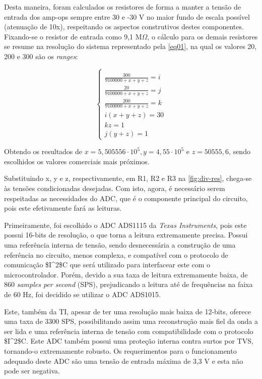 Desta maneira, foram calculados os resistores de forma a manter a tensão de entrada dos \gls{amp-op}s sempre entre 30 e -30 V no maior fundo de escala possível (atenuação de 10x), respeitando os aspectos construtivos destes componentes. Fixando-se o resistor de entrada como 9,1 M$\Omega$, o cálculo para os demais resistores se resume na resolução do sistema representado pela \autoref{eq01}, na qual os valores 20, 200 e 300 são os \textit{ranges}:

\begin{equation}
    \label{eq01}
    \left\{\begin{matrix}
        \\ \frac{300}{9100000+x+y+z} = i
        \\ \frac{20}{9100000+x+y+z} = j
        \\ \frac{200}{9100000+x+y+z} = k
        \\ i (x+y+z) = 30
        \\ kz = 1
        \\ j(y+z) = 1
    \end{matrix}\right.
\end{equation}

Obtendo os resultados de $x = 5,505556 \cdot 10^{5}, y = 4,55 \cdot 10^{5}$ e $z = 50555,6$, sendo escolhidos os valores comerciais mais próximos.

Substituindo x, y e z, respectivamente, em R1, R2 e R3 na \autoref{fig:div-res}, chega-se às tensões condicionadas desejadas. Com isto, agora, é necessário serem respeitadas as necessidades do \gls{ADC}, que é o componente principal do circuito, pois este efetivamente fará as leituras.

Primeiramente, foi escolhido o \gls{ADC} ADS1115 da \textit{Texas Instruments}, pois este possui 16-bits de resolução, o que torna a leitura extremamente precisa. Possui uma referência interna de tensão, sendo desnecessária a construção de uma referência no circuito, menos complexa, e compatível com o protocolo de comunicação \gls{$I^2$C} que será utilizado para interfacear este com o microcontrolador. Porém, devido a sua taxa de leitura extremamente baixa, de 860 \textit{samples per second} (\gls{SPS}), prejudicando a leitura até de frequências na faixa de 60 Hz, foi decidido se utilizar o \gls{ADC} ADS1015.

Este, também da \gls{TI}, apesar de ter uma resolução mais baixa de 12-bits, oferece uma taxa de 3300 \gls{SPS}, possibilitando assim uma reconstrução mais fiel da onda a ser lida e uma referência interna de tensão com compatibilidade com o protocolo \gls{$I^2$C}. Este \gls{ADC} também possui uma proteção interna contra surtos por \gls{TVS}, tornando-o extremamente robusto. Os requerimentos para o funcionamento adequado deste \gls{ADC} são uma tensão de entrada máxima de 3,3 V e esta não pode ser negativa.

